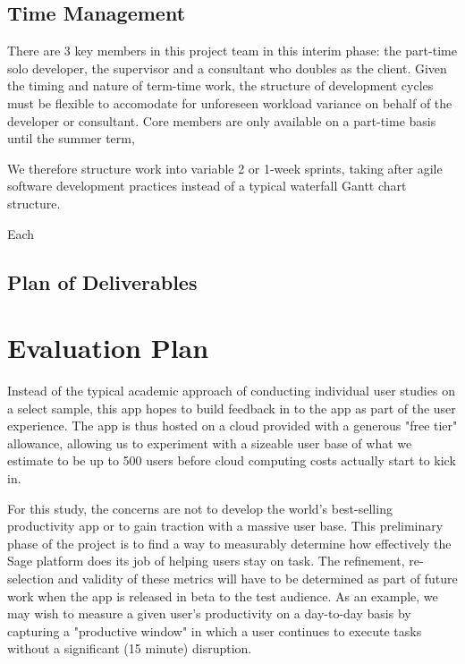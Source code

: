 


\subsection{Time Management}
There are 3 key members in this project team in this interim phase: the part-time solo developer, the supervisor and a consultant who doubles as the client. Given the timing and nature of term-time work, the structure of development cycles must be flexible to accomodate for unforeseen workload variance on behalf of the developer or consultant. Core members are only available on a part-time basis until the summer term,

We therefore structure work into variable 2 or 1-week sprints, taking after agile software development practices instead of a typical waterfall Gantt chart structure. 

Each 

\subsection{Plan of Deliverables}


\section{Evaluation Plan}
Instead of the typical academic approach of conducting individual user studies on a select sample, this app hopes to build feedback in to the app as part of the user experience. The app is thus hosted on a cloud provided with a generous "free tier" allowance, allowing us to experiment with a sizeable user base of what we estimate to be up to 500 users before cloud computing costs actually start to kick in.

For this study, the concerns are not to develop the world's best-selling productivity app or to gain traction with a massive user base. This preliminary phase of the project is to find a way to measurably determine how effectively the Sage platform does its job of helping users stay on task. The refinement, re-selection and validity of these metrics will have to be determined as part of future work when the app is released in beta to the test audience. As an example, we may wish to measure a given user's productivity on a day-to-day basis by capturing a "productive window" in which a user continues to execute tasks without a significant (15 minute) disruption.


